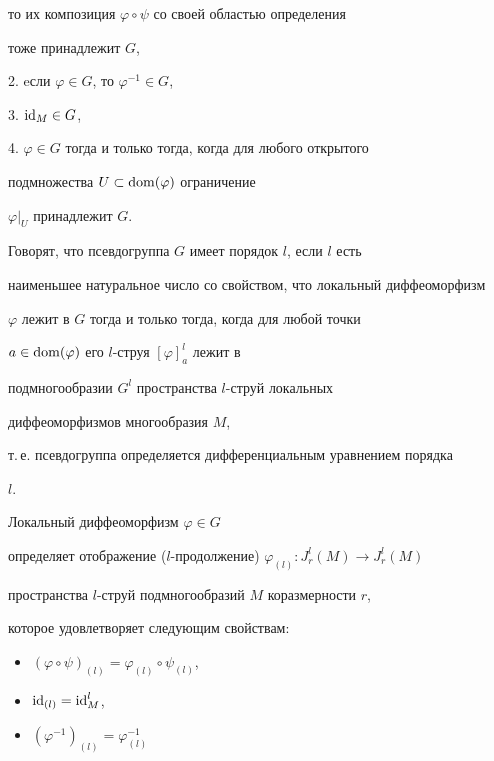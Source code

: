 то их композиция $\varphi \circ \psi$ со своей областью определения


тоже принадлежит $G$,





2. eсли $\varphi \in G$, то $\varphi^{-1} \in G$,





3. $\operatorname{id}_M \in G$,





4. $\varphi \in G$ тогда и только тогда, когда для любого открытого


подмножества $U \subset \operatorname{dom} (\varphi)$ ограничение


$\varphi|_U$ принадлежит $G$.





Говорят, что псевдогруппа $G$ имеет порядок $l$, если $l$ есть


наименьшее натуральное число со свойством, что локальный диффеоморфизм


$\varphi$ лежит в $G$ тогда и только тогда, когда для любой точки


$a \in \operatorname{dom} (\varphi)$ его $l$-струя $[\varphi]^l_a$ лежит в


подмногообразии $G^l$ пространства $l$-струй локальных


диффеоморфизмов многообразия $M$,


т.\,е. псевдогруппа определяется дифференциальным уравнением порядка


$l$.





Локальный диффеоморфизм $\varphi \in G$


определяет отображение ($l$-продолжение) $\varphi_{(l)} : J^l_r(M) \to


J^l_r(M)$


пространства $l$-струй подмногообразий $M$ коразмерности $r$,


которое удовлетворяет следующим свойствам:





\begin{itemize}


\item[---] $(\varphi \circ \psi)_{(l)} = \varphi_{(l)} \circ \psi_{(l)}$,


\item[---] $\operatorname{id}_{(l)} = \operatorname{id}^l_M$,


\item[---] $(\varphi^{-1})_{(l)}=\varphi_{(l)}^{-1}$


\end{itemize}


